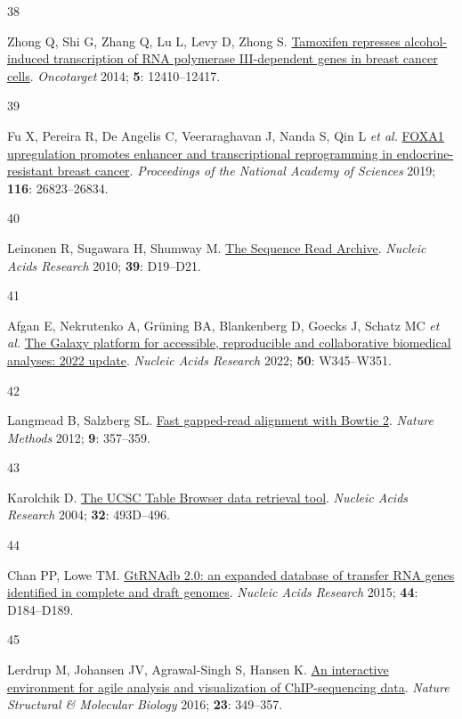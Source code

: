 \documentclass[
  12pt,
]{article}
\newlength{\cslhangindent}
\newlength{\csllabelwidth}
\newlength{\cslentryspacingunit} %
\newenvironment{CSLReferences}[2] %
 {%
  \setlength{\parindent}{0pt}
  \ifodd #1
  \let\oldpar\par
  \def\par{\hangindent=\cslhangindent\oldpar}
  \fi
  \setlength{\parskip}{#2\cslentryspacingunit}
 }%
 {}
\newcommand{\CSLLeftMargin}[1]{\parbox[t]{\csllabelwidth}{#1}}
\newcommand{\CSLRightInline}[1]{\parbox[t]{\linewidth - \csllabelwidth}{#1}\break}
\begin{document}
\begin{CSLReferences}{0}{0}
\leavevmode{}%
\CSLLeftMargin{38 }%
\CSLRightInline{Zhong Q, Shi G, Zhang Q, Lu L, Levy D, Zhong S. \href{https://doi.org/10.18632/oncotarget.2678}{Tamoxifen represses alcohol-induced transcription of RNA polymerase III-dependent genes in breast cancer cells}. \emph{Oncotarget} 2014; \textbf{5}: 12410--12417.}

\leavevmode{}%
\CSLLeftMargin{39 }%
\CSLRightInline{Fu X, Pereira R, De Angelis C, Veeraraghavan J, Nanda S, Qin L \emph{et al.} \href{https://doi.org/10.1073/pnas.1911584116}{FOXA1 upregulation promotes enhancer and transcriptional reprogramming in endocrine-resistant breast cancer}. \emph{Proceedings of the National Academy of Sciences} 2019; \textbf{116}: 26823--26834.}

\leavevmode{}%
\CSLLeftMargin{40 }%
\CSLRightInline{Leinonen R, Sugawara H, Shumway M. \href{https://doi.org/10.1093/nar/gkq1019}{The Sequence Read Archive}. \emph{Nucleic Acids Research} 2010; \textbf{39}: D19--D21.}

\leavevmode{}%
\CSLLeftMargin{41 }%
\CSLRightInline{Afgan E, Nekrutenko A, Grüning BA, Blankenberg D, Goecks J, Schatz MC \emph{et al.} \href{https://doi.org/10.1093/nar/gkac247}{The Galaxy platform for accessible, reproducible and collaborative biomedical analyses: 2022 update}. \emph{Nucleic Acids Research} 2022; \textbf{50}: W345--W351.}

\leavevmode{}%
\CSLLeftMargin{42 }%
\CSLRightInline{Langmead B, Salzberg SL. \href{https://doi.org/10.1038/nmeth.1923}{Fast gapped-read alignment with Bowtie 2}. \emph{Nature Methods} 2012; \textbf{9}: 357--359.}

\leavevmode{}%
\CSLLeftMargin{43 }%
\CSLRightInline{Karolchik D. \href{https://doi.org/10.1093/nar/gkh103}{The UCSC Table Browser data retrieval tool}. \emph{Nucleic Acids Research} 2004; \textbf{32}: 493D--496.}

\leavevmode{}%
\CSLLeftMargin{44 }%
\CSLRightInline{Chan PP, Lowe TM. \href{https://doi.org/10.1093/nar/gkv1309}{GtRNAdb 2.0: an expanded database of transfer RNA genes identified in complete and draft genomes}. \emph{Nucleic Acids Research} 2015; \textbf{44}: D184--D189.}

\leavevmode{}%
\CSLLeftMargin{45 }%
\CSLRightInline{Lerdrup M, Johansen JV, Agrawal-Singh S, Hansen K. \href{https://doi.org/10.1038/nsmb.3180}{An interactive environment for agile analysis and visualization of ChIP-sequencing data}. \emph{Nature Structural \& Molecular Biology} 2016; \textbf{23}: 349--357.}


\end{CSLReferences}
\end{document}
